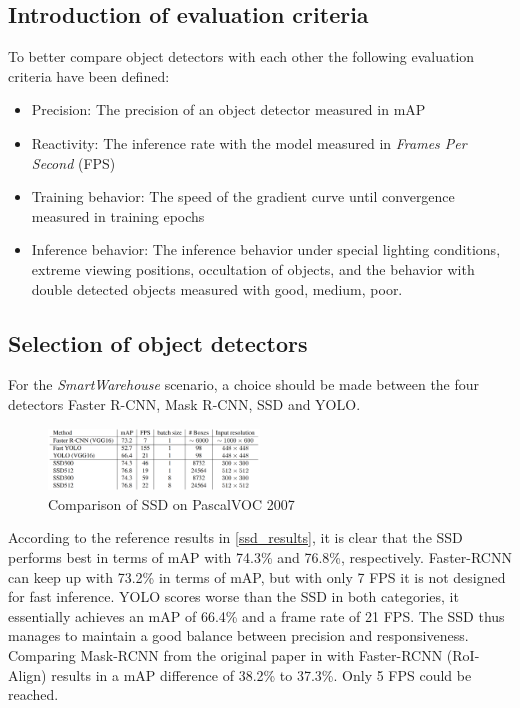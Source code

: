 \documentclass[a4paper, 10pt, journal]{wissarbIEEE}      %
\begin{document}
\subsection{Introduction of evaluation criteria}

To better compare object detectors with each other the following evaluation criteria have been defined:

\begin{itemize}
	\item Precision: The precision of an object detector measured in mAP
	\item Reactivity: The inference rate with the model measured in \textit{Frames Per Second} (FPS)
	\item Training behavior: The speed of the gradient curve until convergence measured in training epochs
	\item Inference behavior: The inference behavior under special lighting conditions, extreme viewing positions, occultation of objects, and the behavior with double detected objects measured with good, medium, poor. 
\end{itemize}

\subsection{Selection of object detectors}

For the \textit{SmartWarehouse} scenario, a choice should be made between the four detectors Faster R-CNN, Mask R-CNN, SSD and YOLO. 

\begin{figure}[h]
	\centering
	\includegraphics[width=0.5\textwidth]{fig/ssd_results.png}
	\caption{Comparison of SSD on PascalVOC 2007 \cite{WeiLiuDragomirAnguelovDumitruErhanChristianSzegedyScottReedChengYangFuAlexander.2016}}
	\label{ssd_results}
\end{figure}

According to the reference results in \autoref{ssd_results}, it is clear that the SSD performs best in terms of mAP with 74.3\% and 76.8\%, respectively. Faster-RCNN can keep up with 73.2\% in terms of mAP,
but with only 7 FPS it is not designed for fast inference. YOLO scores worse than the SSD in both categories, it essentially achieves an mAP of 66.4\% and a frame rate of 21 FPS. The SSD thus manages to maintain a good balance between precision and responsiveness. Comparing Mask-RCNN from the original paper in \cite{KaimingHeGeorgiaGkioxariPiotrDollarRossGirshick.2018} with Faster-RCNN (RoI-Align) results in a mAP difference of 38.2\% to 37.3\%. Only 5 FPS could be reached. 
\end{document}
